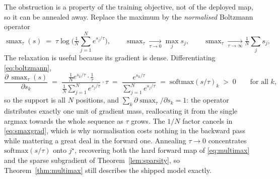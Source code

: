 \documentclass[10pt]{article}
\theoremstyle{plain}
\theoremstyle{definition}
\theoremstyle{remark}
\DeclareMathOperator*{\smax}{smax}
\begin{document}
The obstruction is a property of the training objective, not of the deployed map, so it
can be annealed away. Replace the maximum by the \emph{normalised} Boltzmann operator
\citep{asadi2017boltzmann}
\begin{equation}
  \smax_\tau(s)\;=\;\tau\log\!\Big(\tfrac1N\textstyle\sum_{j=1}^{N}e^{s_j/\tau}\Big),
  \qquad
  \smax_\tau\xrightarrow[\tau\to0]{}\max_j s_j,
  \qquad
  \smax_\tau\xrightarrow[\tau\to\infty]{}\tfrac1N\textstyle\sum_j s_j,
  \label{eq:boltzmann}
\end{equation}
The relaxation is useful because its gradient is dense. Differentiating
\eqref{eq:boltzmann},
\begin{equation}
  \frac{\partial\,\smax_\tau(s)}{\partial s_k}
  \;=\;\frac{\tfrac1N e^{s_k/\tau}\cdot\tfrac1\tau}
            {\tfrac1N\sum_{j=1}^{N}e^{s_j/\tau}}\cdot\tau
  \;=\;\frac{e^{s_k/\tau}}{\sum_{j=1}^{N}e^{s_j/\tau}}
  \;=\;\mathrm{softmax}(s/\tau)_k \;>\;0
  \qquad\text{for all } k,
  \label{eq:smaxgrad}
\end{equation}
so the support is all $N$ positions, and $\sum_k\partial\smax_\tau/\partial s_k=1$: the
operator distributes exactly one unit of gradient mass, reallocating it from the single
argmax towards the whole sequence as $\tau$ grows. The $1/N$ factor cancels in
\eqref{eq:smaxgrad}, which is why normalisation costs nothing in the backward pass while
mattering a great deal in the forward one. Annealing $\tau\to0$ concentrates
$\mathrm{softmax}(s/\tau)$ onto $j^\star$, recovering both the hard forward map of
\eqref{eq:multimax} and the sparse subgradient of Theorem~\ref{lem:sparsity}, so
Theorem~\ref{thm:multimax} still describes the shipped model exactly.
\end{document}
